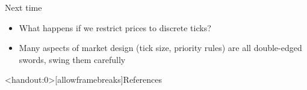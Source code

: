 \documentclass[english,10pt
,aspectratio=169
]{beamer}
\begin{document}
\begin{frame}{Next time}
	\begin{itemize}
		\item What happens if we restrict prices to discrete ticks?
		\item Many aspects of market design (tick size, priority rules) are all double-edged swords, swing them carefully
	\end{itemize}
\end{frame}







\appendix
\begin{frame}<handout:0>[allowframebreaks]{References}
	
	
\end{frame}
\end{document}
